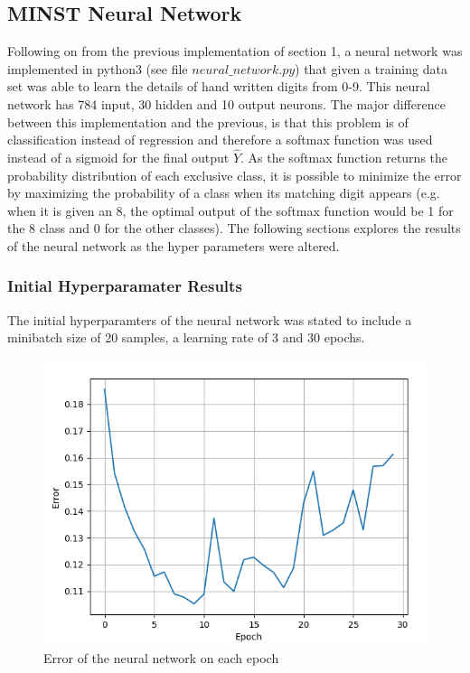 \documentclass{article}
\begin{document}
\subsection{MINST Neural Network}
Following on from the previous implementation of section 1, a neural network was implemented in python3 (see file $neural\_network.py$) that given a training data set was able to learn the details of hand written digits from 0-9. This neural network has 784 input, 30 hidden and 10 output neurons. The major difference between this implementation and the previous, is that this problem is of classification instead of regression and therefore a softmax function was used instead of a sigmoid for the final output $\hat{Y}$. As the softmax function returns the probability distribution of each exclusive class, it is possible to minimize the error by maximizing the probability of a class when its matching digit appears (e.g. when it is given an 8, the optimal output of the softmax function would be 1 for the 8 class and 0 for the other classes). The following sections explores the results of the neural network as the hyper parameters were altered.\\

\subsubsection{Initial Hyperparamater Results}
The initial hyperparamters of the neural network was stated to include a minibatch size of 20 samples, a learning rate of 3 and 30 epochs.

\begin{figure}[!htb]
\centering
	\includegraphics[scale=0.6]{lr3epoch30.png}
\caption{Error of the neural network on each epoch}
\end{figure}
\end{document}

